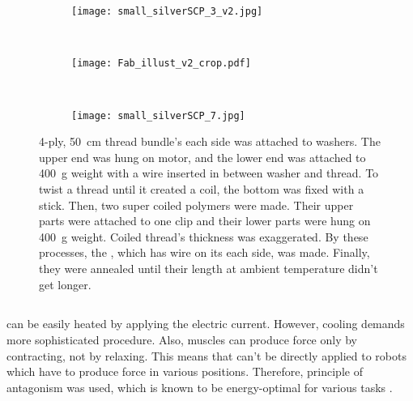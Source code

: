 \begin{figure}
	\centering
	\begin{subfigure}{.15\linewidth}
		\centering\texttt{[image: small\_silverSCP\_3\_v2.jpg]}
		\caption{\label{silverSCP_2}}
	\end{subfigure}
	~
	\begin{subfigure}{.45\linewidth}
		\centering\texttt{[image: Fab\_illust\_v2\_crop.pdf]}
		\caption{\label{silverSCP_illust}}
	\end{subfigure}
	~
	\begin{subfigure}{.15\linewidth}
		\centering\texttt{[image: small\_silverSCP\_7.jpg]}
		\caption{\label{silverSCP_annealing}}
	\end{subfigure}
	\caption[Process of making \scps with silver-painted nylon thread]{ 4-ply, \SI{50}{\centi\meter} thread bundle's each side was attached to washers. The upper end was hung on motor, and the lower end was attached to \SI{400}{\gram} weight with a wire inserted in between washer and thread.  To twist a thread until it created a coil, the bottom was fixed with a stick. Then, two super coiled polymers were made. Their upper parts were attached to one clip and their lower parts were hung on \SI{400}{\gram} weight. Coiled thread's thickness was exaggerated.  By these processes, the \scpnospace, which has wire on its each side, was made. Finally, they were annealed until their length at ambient temperature didn't get longer.}
	\label{silverSCP_makingof}
\end{figure}

\subsection{\ANTA} \label{subsection_anta}
\scps can be easily heated by applying the electric current. However, cooling demands more sophisticated procedure. Also, muscles can produce force only by contracting, not by relaxing. This means that \scps can't be directly applied to robots which have to produce force in various positions.
Therefore, principle of antagonism was used, which is known to be energy-optimal for various tasks \cite{antagonism}.

